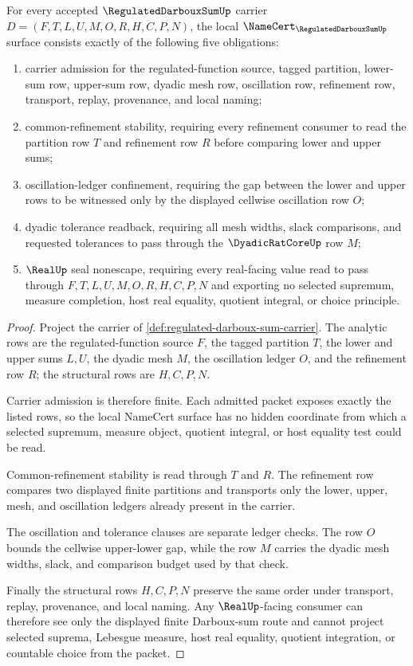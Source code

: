 \begin{theorem}
\label{thm:regulated-darboux-sum-obligations}
For every accepted $\RegulatedDarbouxSumUp$ carrier $D=(F,T,L,U,M,O,R,H,C,P,N)$, the local $\NameCert_{\RegulatedDarbouxSumUp}$ surface consists exactly of the following five obligations:
\begin{enumerate}
\item carrier admission for the regulated-function source, tagged partition, lower-sum row, upper-sum row, dyadic mesh row, oscillation row, refinement row, transport, replay, provenance, and local naming;
\item common-refinement stability, requiring every refinement consumer to read the partition row $T$ and refinement row $R$ before comparing lower and upper sums;
\item oscillation-ledger confinement, requiring the gap between the lower and upper rows to be witnessed only by the displayed cellwise oscillation row $O$;
\item dyadic tolerance readback, requiring all mesh widths, slack comparisons, and requested tolerances to pass through the $\DyadicRatCoreUp$ row $M$;
\item $\RealUp$ seal nonescape, requiring every real-facing value read to pass through $F,T,L,U,M,O,R,H,C,P,N$ and exporting no selected supremum, measure completion, host real equality, quotient integral, or choice principle.
\end{enumerate}
\end{theorem}
\begin{proof}
Project the carrier of \autoref{def:regulated-darboux-sum-carrier}. The analytic rows are the regulated-function source $F$, the tagged partition $T$, the lower and upper sums $L,U$, the dyadic mesh $M$, the oscillation ledger $O$, and the refinement row $R$; the structural rows are $H,C,P,N$.

Carrier admission is therefore finite. Each admitted packet exposes exactly the listed rows, so the local NameCert surface has no hidden coordinate from which a selected supremum, measure object, quotient integral, or host equality test could be read.

Common-refinement stability is read through $T$ and $R$. The refinement row compares two displayed finite partitions and transports only the lower, upper, mesh, and oscillation ledgers already present in the carrier.

The oscillation and tolerance clauses are separate ledger checks. The row $O$ bounds the cellwise upper-lower gap, while the row $M$ carries the dyadic mesh widths, slack, and comparison budget used by that check.

Finally the structural rows $H,C,P,N$ preserve the same order under transport, replay, provenance, and local naming. Any $\RealUp$-facing consumer can therefore see only the displayed finite Darboux-sum route and cannot project selected suprema, Lebesgue measure, host real equality, quotient integration, or countable choice from the packet.
\end{proof}

